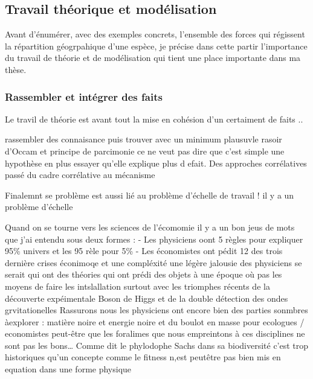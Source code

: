 \subsection*{Travail théorique et
modélisation}\label{travail-thuxe9orique-et-moduxe9lisation}

Avant d'énumérer, avec des exemples concrets, l'ensemble des forces qui
régissent la répartition géogrpahique d'une espèce, je précise dans
cette partir l'importance du travail de théorie et de modélisation qui
tient une place importante dans ma thèse.

\subsubsection*{Rassembler et intégrer des
faits}\label{rassembler-et-intuxe9grer-des-faits}

Le travil de théorie est avant tout la mise en cohésion d'un certaiment
de faits ..

rassembler des connaisance puis trouver avec un minimum plausuvle rasoir
d'Occam et principe de parcimonie ce ne veut pas dire que c'est simple
une hypothèse en plus essayer qu'elle explique plus d efait. Des
approches corrélatives passé du cadre corrélative au mécanisme

Finalemnt se problème est aussi lié au problème d'échelle de travail !
il y a un problème d'échelle

Quand on se tourne vers les sciences de l'écomomie il y a un bon jeus de
mots que j'ai entendu sous deux formes : - Les physiciens oont 5 règles
pour expliquer 95\% univers et les 95 rèle pour 5\% - Les économistes
ont pédit 12 des trois dernière crises éconimoqe et une compléxité une
légère jalousie des physiciens se serait qui ont des théories qui ont
prédi des objets à une époque où pas les moyens de faire les
intslallation surtout avec les triomphes récents de la découverte
expéimentale Boson de Higgs et de la double détection des ondes
grvitationelles Rassurons nous les physiciens ont encore bien des
parties sonmbres àexplorer : matière noire et energie noire et du boulot
en masse pour ecologues / economistes peut-être que les foralimes que
nous empreintons à ces disciplines ne sont pas les bons\ldots{} Comme
dit le phylodophe Sachs dans sa biodiversité c'est trop historiques
qu'un concepte comme le fitness n,est peutêtre pas bien mis en equation
dans une forme physique

